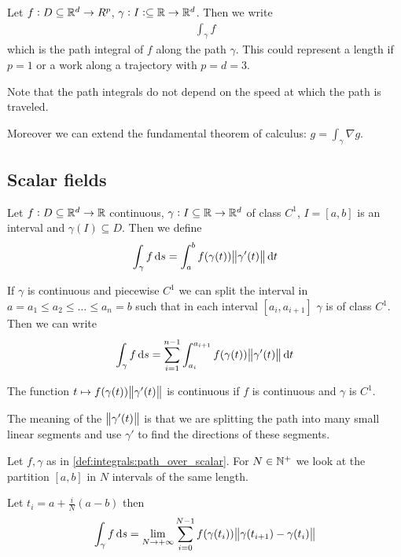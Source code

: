 \documentclass[14pt]{extarticle}
\begin{document}
Let $f: D \subseteq \mathbb{R}^d \to R^p$, $\gamma: I:\subseteq \mathbb{R} \to \mathbb{R}^d$.
Then we write
\begin{eqnarray}
    \int_\gamma f
\end{eqnarray}
which is the path integral of $f$ along the path $\gamma$.
This could represent a length if $p = 1$ or a work along a trajectory with $p = d = 3$.

Note that the path integrals do not depend on the speed at which the path is traveled.

Moreover we can extend the fundamental theorem of calculus: $g = \int_\gamma \nabla g$.

\subsection{Scalar fields}

\begin{definition}
    \label{def:integrals:path_over_scalar}
    Let $f: D \subseteq \mathbb{R}^d \to \mathbb{R}$ continuous, $\gamma: I \subseteq \mathbb{R} \to \mathbb{R}^d$ of class $C^1$, $I = [a, b]$ is an interval and $\gamma(I) \subseteq D$.
    Then we define
    \begin{equation}
        \int_\gamma f \dd{s} = \int_a^b f(\gamma(t)) \norm{\gamma'(t)} \dd{t}
    \end{equation}

    If $\gamma$ is continuous and piecewise $C^1$ we can split the interval in $a = a_1 \leq a_2 \leq \dots \leq a_n = b$ such that in each interval $[a_i, a_{i+1}]$ $\gamma$ is of class $C^1$.
    Then we can write
    \begin{equation}
        \int_{\gamma} f \dd{s} = \sum^{n -1}_{i = 1} \int^{a_{i+1}}_{a_i} f(\gamma(t)) \norm{\gamma'(t)} \dd{t}
    \end{equation}
\end{definition}

\begin{remark}
    The function $t \mapsto f(\gamma(t)) \norm{\gamma'(t)}$ is continuous if $f$ is continuous and $\gamma$ is $C^1$.
\end{remark}

The meaning of the $\norm{\gamma'(t)}$ is that we are splitting the path into many small linear segments and use $\gamma'$ to find the directions of these segments.

\begin{proposition}
    Let $f, \gamma$ as in \autoref{def:integrals:path_over_scalar}.
    For $N \in \mathbb{N}^+$ we look at the partition $[a, b]$ in $N$ intervals of the same length.

    Let $t_i = a + \frac{i}{N}(a-b)$
    then
    \begin{equation}
        \int_\gamma f \dd{s} = \lim_{N \to +\infty} \sum_{i = 0}^{N-1} f(\gamma(t_i)) \norm{\gamma(t_{i+1}) - \gamma(t_i)}
    \end{equation}
\end{proposition}
\end{document}
